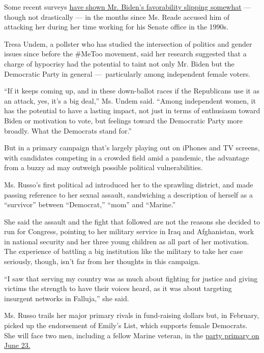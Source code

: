 Some recent surveys
\href{https://www.nytimes3xbfgragh.onion/2020/05/15/us/politics/biden-trump-polls.html}{have
shown Mr. Biden's favorability slipping somewhat} --- though not
drastically --- in the months since Ms. Reade accused him of attacking
her during her time working for his Senate office in the 1990s.

Tresa Undem, a pollster who has studied the intersection of politics and
gender issues since before the \#MeToo movement, said her research
suggested that a charge of hypocrisy had the potential to taint not only
Mr. Biden but the Democratic Party in general ---~particularly among
independent female voters.

``If it keeps coming up, and in these down-ballot races if the
Republicans use it as an attack, yes, it's a big deal,'' Ms. Undem said.
``Among independent women, it has the potential to have a lasting
impact, not just in terms of enthusiasm toward Biden or motivation to
vote, but feelings toward the Democratic Party more broadly. What the
Democrats stand for.''

But in a primary campaign that's largely playing out on iPhones and TV
screens, with candidates competing in a crowded field amid a pandemic,
the advantage from a buzzy ad may outweigh possible political
vulnerabilities.

Ms. Russo's first political ad introduced her to the sprawling district,
and made passing reference to her sexual assault, sandwiching a
description of herself as a ``survivor'' between ``Democrat,'' ``mom''
and ``Marine.''

She said the assault and the fight that followed are not the reasons she
decided to run for Congress, pointing to her military service in Iraq
and Afghanistan, work in national security and her three young children
as all part of her motivation. The experience of battling a big
institution like the military to take her case seriously, though, isn't
far from her thoughts in this campaign.

``I saw that serving my country was as much about fighting for justice
and giving victims the strength to have their voices heard, as it was
about targeting insurgent networks in Falluja,'' she said.

Ms. Russo trails her major primary rivals in fund-raising dollars but,
in February, picked up the endorsement of Emily's List, which supports
female Democrats. She will face two men, including a fellow Marine
veteran, in the
\href{https://www.nytimes3xbfgragh.onion/article/2020-campaign-primary-calendar-coronavirus.html}{party
primary on June 23.}

